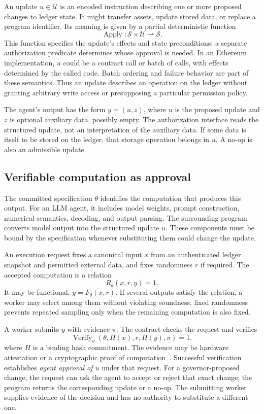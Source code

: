 \documentclass[10pt,letterpaper]{article}
\newcommand{\Verify}{\operatorname{Verify}}
\begin{document}
An update $u\in\mathcal U$ is an encoded instruction describing one or more proposed changes to ledger state. It might transfer assets, update stored data, or replace a program identifier. Its meaning is given by a partial deterministic function
\[
 \operatorname{Apply}:\mathcal S\times\mathcal U\rightharpoonup\mathcal S.
\]
This function specifies the update's effects and state preconditions; a separate authorization predicate determines whose approval is needed. In an Ethereum implementation, $u$ could be a contract call or batch of calls, with effects determined by the called code. Batch ordering and failure behavior are part of these semantics. Thus an update describes an operation on the ledger without granting arbitrary write access or presupposing a particular permission policy.

The agent's output has the form $y=(u,z)$, where $u$ is the proposed update and $z$ is optional auxiliary data, possibly empty. The authorization interface reads the structured update, not an interpretation of the auxiliary data. If some data is itself to be stored on the ledger, that storage operation belongs in $u$. A no-op is also an admissible update.

\subsection{Verifiable computation as approval}
The committed specification $\theta$ identifies the computation that produces this output. For an LLM agent, it includes model weights, prompt construction, numerical semantics, decoding, and output parsing. The surrounding program converts model output into the structured update $u$. These components must be bound by the specification whenever substituting them could change the update.

An execution request fixes a canonical input $x$ from an authenticated ledger snapshot and permitted external data, and fixes randomness $r$ if required. The accepted computation is a relation
\begin{equation}
 R_\theta(x,r,y)=1. \label{eq:relation}
\end{equation}
It may be functional, $y=F_\theta(x,r)$. If several outputs satisfy the relation, a worker may select among them without violating soundness; fixed randomness prevents repeated sampling only when the remaining computation is also fixed.

A worker submits $y$ with evidence $\pi$. The contract checks the request and verifies
\[
 \Verify_\nu(\theta,H(x),r,H(y),\pi)=1,
\]
where $H$ is a binding hash commitment. The evidence may be hardware attestation or a cryptographic proof of computation~\citep{gennaro2010}. Successful verification establishes \emph{agent approval of $u$} under that request. For a governor-proposed change, the request can ask the agent to accept or reject that exact change; the program returns the corresponding update or a no-op. The submitting worker supplies evidence of the decision and has no authority to substitute a different one.
\end{document}
